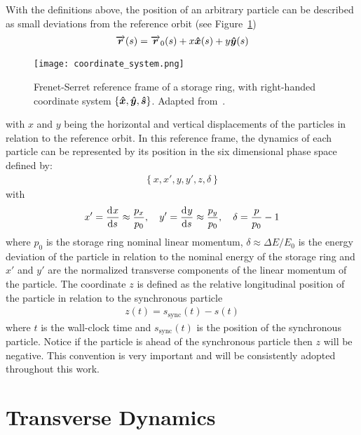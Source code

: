     With the definitions above, the position of an arbitrary particle can be described as small deviations from the reference orbit (see Figure~\ref{fig:reference_frame})
    \begin{align}
        \overrightarrow{\boldsymbol{r}}(s) = \overrightarrow{\boldsymbol{r}}_0(s) + x\boldsymbol{\hat x}(s) + y\boldsymbol{\hat y}(s)
    \end{align}
    \begin{figure}
        \centering
        \texttt{[image: coordinate\_system.png]}
        \caption[Frenet-Serret reference frame of a storage ring]{Frenet-Serret reference frame of a storage ring, with right-handed coordinate system $\{ \boldsymbol{\hat x}, \boldsymbol{\hat y}, \boldsymbol{\hat s} \}$. Adapted from~\cite[pp. 123]{LeeBook}.}
        \label{fig:reference_frame}
    \end{figure}
    with $x$ and $y$ being the horizontal and vertical displacements of the particles in relation to the reference orbit. In this reference frame, the dynamics of each particle can be represented by its position in the six dimensional phase space defined by:
    \begin{align}\label{eq:phase_space_definition}
        \left\{ x, x', y, y', z, \delta \right\}
    \end{align}
    with
    \begin{align}
        x' = \frac{\mathrm{d}^{{}}x}{\mathrm{d} s^{{}}} \approx \frac{p_x}{p_0},\quad
        y' = \frac{\mathrm{d}^{{}}y}{\mathrm{d} s^{{}}} \approx \frac{p_y}{p_0},\quad
        \delta = \frac{p}{p_0}-1
    \end{align}
    where $p_0$ is the storage ring nominal linear momentum, $\delta \approx \Delta E/E_0$ is the energy deviation of the particle in relation to the nominal energy of the storage ring and $x'$ and $y'$ are the normalized transverse components of the linear momentum of the particle. The coordinate $z$ is defined as the relative longitudinal position of the particle in relation to the synchronous particle
    \begin{align}\label{eq:longitudinal_deviations}
        z(t) = s_\text{sync}(t) - s(t)
    \end{align}
    where $t$ is the wall-clock time and $s_\text{sync}(t)$ is the position of the synchronous particle. Notice if the particle is ahead of the synchronous particle then $z$ will be negative. This convention is very important and will be consistently adopted throughout this work.

\section{Transverse Dynamics}

